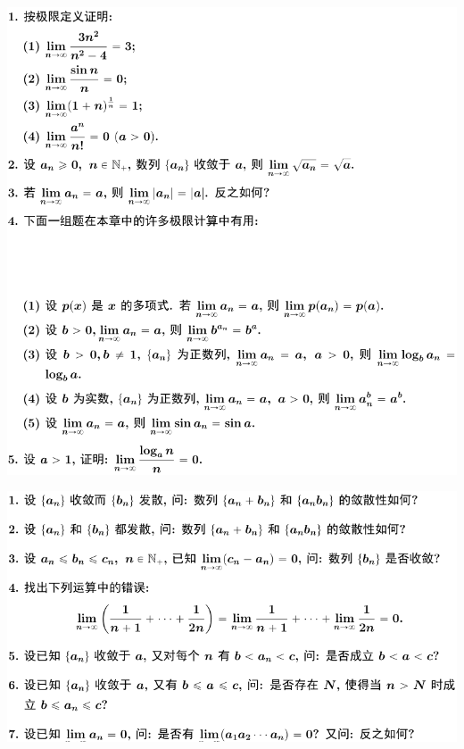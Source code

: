 \documentclass[11pt,a4paper]{ctexart}
\begin{document}
\begin{paracol}{2}
\includegraphics[width=\linewidth]{figure02.png}
\newpage
{}

\includegraphics[width=\linewidth]{figure03.png}
\newpage
{}


\end{paracol}
\end{document}
